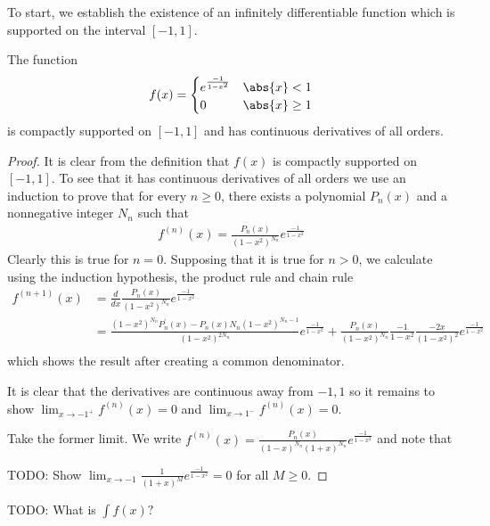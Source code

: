To start, we establish the existence of an infinitely differentiable
function which is supported on the interval $[-1,1]$.

\begin{lem}The function 
\begin{align*}
f(x) = \begin{cases}
e^\frac{-1}{1-x^2} & \abs{x} < 1\\
0 & \abs{x} \geq 1
\end{cases}
\end{align*} is compactly supported on $[-1,1]$ and has continuous
derivatives of all orders.
\end{lem}
\begin{proof}
It is clear from the definition that $f(x)$ is compactly supported on
$[-1,1]$.  To see that it has continuous derivatives of all orders we
use an induction to prove that for every $n\geq 0$, there exists a
polynomial $P_n(x)$ and a nonnegative integer $N_n$ such that 
\begin{align*}
f^{(n)}(x) = \frac{P_n(x)}{(1 - x^2)^{N_n}} e^\frac{-1}{1-x^2}
\end{align*}
Clearly this is true for $n=0$.  Supposing that it is true for $n >0$,
we calculate using the induction hypothesis, the product rule and
chain rule
\begin{align*}
f^{(n+1)}(x) &= \frac{d}{dx}\frac{P_n(x)}{(1 - x^2)^{N_n}}
e^\frac{-1}{1-x^2} \\
&= \frac{(1 - x^2)^{N_n} P_n^\prime(x) - P_n(x) N_n (1- x^2)^{N_n
    -1}}{(1 - x^2)^{2N_n}}e^\frac{-1}{1-x^2} + \frac{P_n(x)}{(1 - x^2)^{N_n}}\frac{-1}{1-x^2} \frac{-2x}{(1-x^2)^2}
e^\frac{-1}{1-x^2} \\
\end{align*}
which shows the result after creating a common denominator.

It is clear that the derivatives are continuous away from ${-1,1}$ so
it remains to show $\lim_{x \to -1^+} f^{(n)}(x) = 0$ and $\lim_{x \to
  1^-} f^{(n)}(x) = 0$.

Take the former limit.  We write $f^{(n)}(x) = \frac{P_n(x)}{(1 -
  x)^{N_n}(1 + x)^{N_n}} e^\frac{-1}{1-x^2}$ and note that


TODO: Show $\lim_{x \to -1} \frac{1}{(1 + x)^M} e^\frac{-1}{1-x^2} = 0$
for all $M \geq 0$.
\end{proof}

TODO: What is $\int f(x)?$

